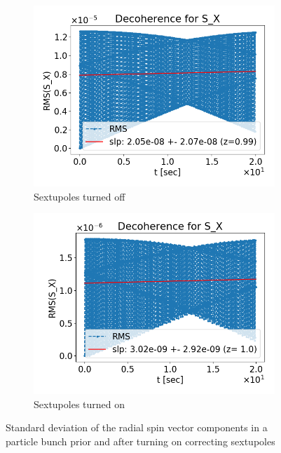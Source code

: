 \documentclass[a4paper]{jacow}
\begin{document}
\begin{figure}[h!]
  \centering
  \begin{subfigure}{\linewidth}
    \centering
    \includegraphics[width=\linewidth]{../img/IPAC19/SX_decoh_20sec_unopt}
    \caption{Sextupoles turned off}
  \end{subfigure}
  \begin{subfigure}{\linewidth}
    \centering
    \includegraphics[width=\linewidth]{../img/IPAC19/SX_decoh_20sec_opt}
    \caption{Sextupoles turned on}
  \end{subfigure}
  \caption{Standard deviation of the radial spin vector components in a particle bunch prior and after turning on correcting sextupoles\label{fig:decoh_rms_sx}}
\end{figure}
\end{document}
